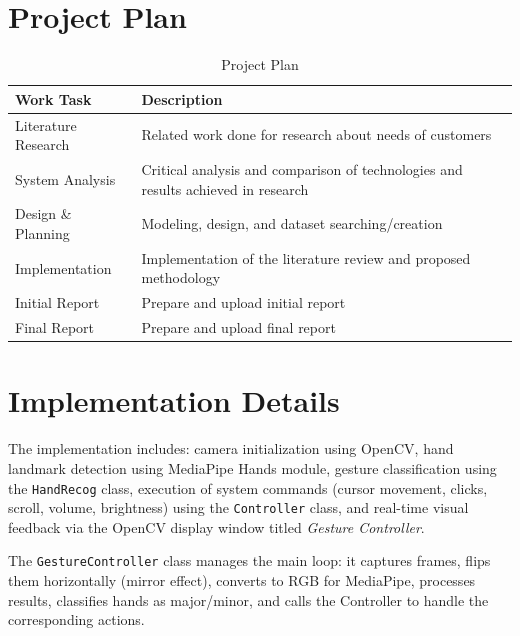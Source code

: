 \documentclass[12pt,a4paper]{report}
\begin{document}
\begin{enumerate}
\section{Project Plan}

\begin{table}[ht]
\centering
\caption{Project Plan}
\label{tab:projectplan}
\begin{tabular}{|l|p{9cm}|}
\hline
\textbf{Work Task} & \textbf{Description} \\
\hline
Literature Research & Related work done for research about needs of customers \\
\hline
System Analysis     & Critical analysis and comparison of technologies and results achieved in research \\
\hline
Design \& Planning  & Modeling, design, and dataset searching/creation \\
\hline
Implementation      & Implementation of the literature review and proposed methodology \\
\hline
Initial Report      & Prepare and upload initial report \\
\hline
Final Report        & Prepare and upload final report \\
\hline
\end{tabular}
\end{table}

\section{Implementation Details}

The implementation includes: camera initialization using OpenCV, hand landmark detection using
MediaPipe Hands module, gesture classification using the \texttt{HandRecog} class, execution
of system commands (cursor movement, clicks, scroll, volume, brightness) using the
\texttt{Controller} class, and real-time visual feedback via the OpenCV display window titled
\textit{Gesture Controller}.

The \texttt{GestureController} class manages the main loop: it captures frames, flips them
horizontally (mirror effect), converts to RGB for MediaPipe, processes results, classifies
hands as major/minor, and calls the Controller to handle the corresponding actions.
\newpage

\end{enumerate}
\end{document}
